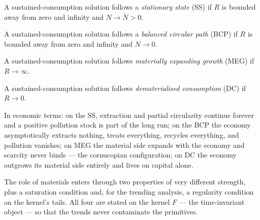 \begin{definition}\label{def:sp:sss}
A sustained-consumption solution follows a \emph{stationary state} (SS) if $R$ is bounded away
from zero and infinity and $N\to\bar N>0$.
\end{definition}

\begin{definition}\label{def:sp:bcp}
A sustained-consumption solution follows a \emph{balanced circular path} (BCP) if $R$ is
bounded away from zero and infinity and $N\to0$.
\end{definition}

\begin{definition}\label{def:sp:meg}
A sustained-consumption solution follows \emph{materially expanding growth} (MEG) if
$R\to\infty$.
\end{definition}

\begin{definition}\label{def:sp:dc}
A sustained-consumption solution follows \emph{dematerialised consumption} (DC) if $R\to0$.
\end{definition}

In economic terms: on the SS, extraction and partial circularity continue forever and a
positive pollution stock is part of the long run; on the BCP the economy asymptotically
extracts nothing, treats everything, recycles everything, and pollution vanishes; on MEG the
material side expands with the economy and scarcity never binds --- the cornucopian
configuration; on DC the economy outgrows its material side entirely and lives on capital
alone.

 The role of materials enters through two properties of
very different strength, plus a saturation condition and, for the trending analysis, a
regularity condition on the kernel's tails. All four are stated on the kernel $F$ --- the
time-invariant object --- so that the trends never contaminate the primitives.


